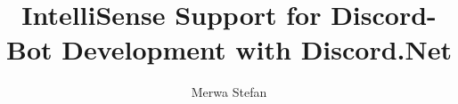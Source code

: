\documentclass[bachelor,english,smartquotes,proposal]{hgbthesis}
\begin{document}


\title{IntelliSense Support for Discord-Bot Development with Discord.Net}
\author{Merwa Stefan}


\frontmatter                                   %

\maketitle
\tableofcontents

			

\mainmatter                                    %



\MakeBibliography                                                 %

\end{document}
